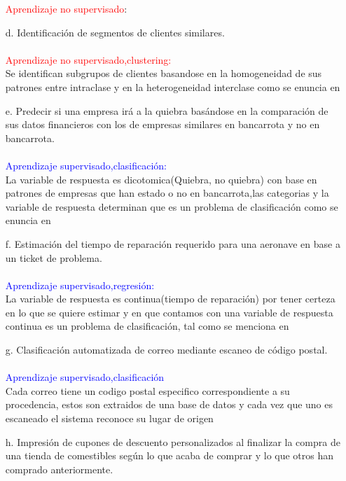 \documentclass[9pt,letterpaper]{article}\usepackage[]{graphicx}\usepackage[]{color}
\begin{document}
\begin{enumerate}
\textcolor{red}{Aprendizaje  no supervisado}: \\
    \item[d.] Identificación de segmentos de clientes similares.
\\ \\
\textcolor{red}{Aprendizaje no supervisado,clustering:} \\ 
Se identifican subgrupos de clientes basandose en la homogeneidad de sus patrones entre intraclase y en la heterogeneidad interclase como se enuncia en \cite{timaran_pereira_descubrimiento_2016}
        \item[e.] Predecir si una empresa irá a la quiebra basándose en la comparación de sus datos financieros
con los de empresas similares en bancarrota y no en bancarrota.
\\ \\
\textcolor{blue}{Aprendizaje supervisado,clasificación:} \\
La variable de respuesta es dicotomica(Quiebra, no quiebra) con base en patrones de empresas que han estado o no en bancarrota,las categorias y la variable de respuesta determinan que es un problema de clasificación como se enuncia en \cite{ramos_aprendizaje_2019}
            \item[f.] Estimación del tiempo de reparación requerido para una aeronave en base a un ticket de
problema.
\\ \\
\textcolor{blue}{Aprendizaje supervisado,regresión:} \\
La variable de respuesta es continua(tiempo de reparación) por tener certeza en lo que se quiere estimar y en que contamos con una variable de respuesta continua es un problema de clasificación, tal como se menciona en \cite{ramos_aprendizaje_2019}
                \item[g.] Clasificación automatizada de correo mediante escaneo de código postal.
\\ \\
\textcolor{blue}{Aprendizaje supervisado,clasificación}\\ 
Cada correo tiene un codigo postal  especifico correspondiente a su procedencia, estos son extraidos de una base de datos y cada vez que uno es escaneado el sistema reconoce su lugar de origen
            \item[h.] Impresión de cupones de descuento personalizados al finalizar la compra de una tienda de
comestibles según lo que acaba de comprar y lo que otros han comprado anteriormente.
\\ \\

\end{enumerate}
\end{document}

